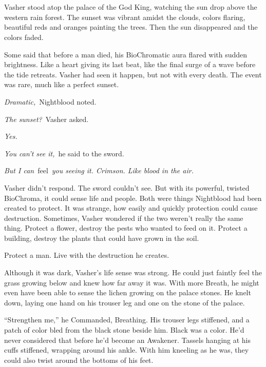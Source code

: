 \chapter{}

Vasher stood atop the palace of the God King, watching the sun drop above the western rain forest. The sunset was vibrant amidst the clouds, colors flaring, beautiful reds and oranges painting the trees. Then the sun disappeared and the colors faded.

Some said that before a man died, his BioChromatic aura flared with sudden brightness. Like a heart giving its last beat, like the final surge of a wave before the tide retreats. Vasher had seen it happen, but not with every death. The event was rare, much like a perfect sunset.

\textit{Dramatic,}~Nightblood noted.

\textit{The sunset?}~Vasher asked.

\textit{Yes.}

\textit{You can’t see it,}~he said to the sword.

\textit{But I can}~feel~\textit{you seeing it. Crimson. Like blood in the air.}

Vasher didn’t respond. The sword couldn’t see. But with its powerful, twisted BioChroma, it could sense life and people. Both were things Nightblood had been created to protect. It was strange, how easily and quickly protection could cause destruction. Sometimes, Vasher wondered if the two weren’t really the same thing. Protect a flower, destroy the pests who wanted to feed on it. Protect a building, destroy the plants that could have grown in the soil.

Protect a man. Live with the destruction he creates.

Although it was dark, Vasher’s life sense was strong. He could just faintly feel the grass growing below and knew how far away it was. With more Breath, he might even have been able to sense the lichen growing on the palace stones. He knelt down, laying one hand on his trouser leg and one on the stone of the palace.

“Strengthen me,” he Commanded, Breathing. His trouser legs stiffened, and a patch of color bled from the black stone beside him. Black was a color. He’d never considered that before he’d become an Awakener. Tassels hanging at his cuffs stiffened, wrapping around his ankle. With him kneeling as he was, they could also twist around the bottoms of his feet.

